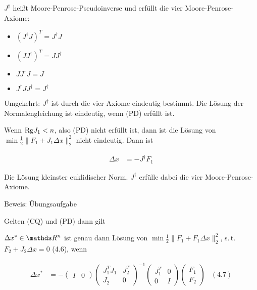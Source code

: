 $J^\dagger$ heißt Moore-Penrose-Pseudoinverse und erfüllt die vier Moore-Penrose-Axiome:

\begin{itemize}
\item $(J^\dagger J)^T = J^\dagger J$
\item $(J J^\dagger)^T = J J^\dagger$
\item $J J^\dagger J = J$
\item $J^\dagger J J^\dagger = J^\dagger$
\end{itemize}

Umgekehrt: $J^\dagger$ ist durch die vier Axiome eindeutig bestimmt. Die Lösung der Normalengleichung ist eindeutig, wenn (PD) erfüllt ist.


Wenn $\mathrm{Rg} J_1 < n$, also (PD) nicht erfüllt ist, dann ist die Lösung von $\min \frac 12 \|F_1 + J_1 \Delta x \|_2^2$ nicht eindeutig. Dann ist

\begin{align*}
\Delta x &= - J^\dagger F_1
\end{align*}

Die Lösung kleinster euklidischer Norm. $J^\dagger$ erfülle dabei die vier Moore-Penrose-Axiome.

Beweis: Übungsaufgabe %



Gelten (CQ) und (PD) dann gilt

$\Delta x^* \in \R^n$ ist genau dann Lösung von $\min \frac 12 \| F_1 + F_1 \Delta x\|_2^2$, s.\,t. $F_2 + J_2 \Delta x = 0$ (4.6), wenn 

\begin{align*}
\Delta x^* &= - \begin{pmatrix} I & 0 \end{pmatrix} \begin{pmatrix} J_1^T J_1 & J_2^T \\ J_2 & 0 \end{pmatrix}^{-1} \begin{pmatrix} J_1^T & 0 \\ 0 & I \end{pmatrix} \begin{pmatrix} F_1 \\ F_2 \end{pmatrix} & (4.7)
\end{align*}

